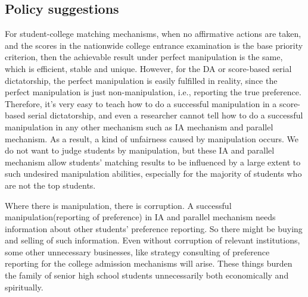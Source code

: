  






\subsection{Policy suggestions}

For student-college matching mechanisms, when no affirmative actions are taken, and the scores in the nationwide college entrance examination is the base priority criterion, then the achievable result under perfect
manipulation is the same, which is efficient, stable and
unique. However, for the DA or score-based serial dictatorship,
the perfect manipulation is easily fulfilled in reality, since the
perfect manipulation is just non-manipulation, i.e., reporting the
true preference. Therefore, it's very easy to teach how to do a
successful manipulation in a score-based serial dictatorship, and even
a researcher cannot tell how to do a successful manipulation in
any other mechanism such as IA mechanism and parallel mechanism. As a
result, a kind of unfairness caused by manipulation occurs. We do not
want to judge students by manipulation, but these IA and parallel
mechanism allow students' matching results to be influenced by a large
extent to such undesired manipulation abilities, especially for the
majority of students
who are not the top students. 

Where there is manipulation, there is
corruption. A successful manipulation(reporting of preference) in IA
and parallel mechanism needs information about other students'
preference reporting. So there might be buying and selling of such
information. Even without corruption of relevant institutions, some
other unnecessary  businesses, like strategy
consulting of preference  reporting  for  the college admission
mechanisms will arise.  These things  burden the family
of senior high school students unnecessarily both economically and
spiritually.




 